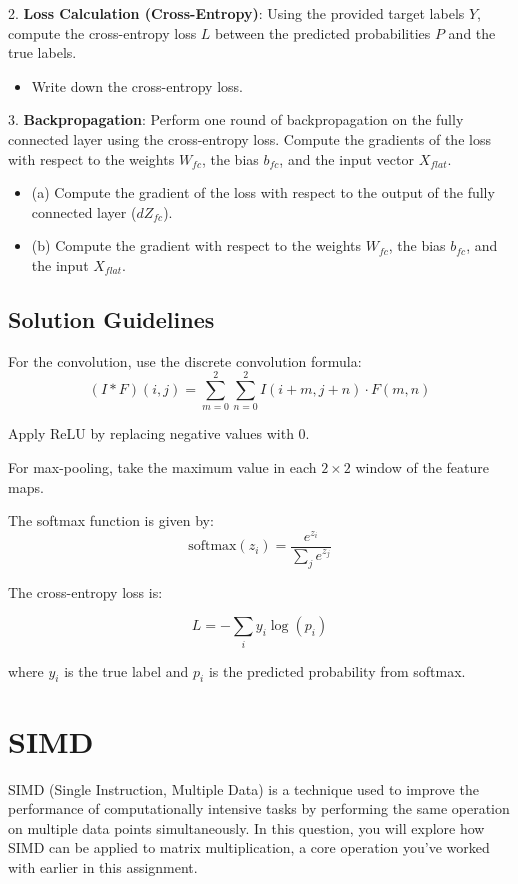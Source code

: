 \documentclass[a4 paper]{article}
\begin{document}
2. \textbf{Loss Calculation (Cross-Entropy)}: Using the provided target labels $Y$, compute the cross-entropy loss $L$ between the predicted probabilities $P$ and the true labels.
    \begin{itemize}
        \item Write down the cross-entropy loss.
    \end{itemize}

3. \textbf{Backpropagation}: Perform one round of backpropagation on the fully connected layer using the cross-entropy loss. Compute the gradients of the loss with respect to the weights $W_{fc}$, the bias $b_{fc}$, and the input vector $X_{flat}$.
    \begin{itemize}
        \item (a) Compute the gradient of the loss with respect to the output of the fully connected layer ($dZ_{fc}$).
        \item (b) Compute the gradient with respect to the weights $W_{fc}$, the bias $b_{fc}$, and the input $X_{flat}$.
    \end{itemize}

\subsection*{Solution Guidelines}
For the convolution, use the discrete convolution formula:
\[
(I * F)(i, j) = \sum_{m=0}^{2} \sum_{n=0}^{2} I(i+m, j+n) \cdot F(m, n)
\]

Apply ReLU by replacing negative values with 0.

For max-pooling, take the maximum value in each $2 \times 2$ window of the feature maps.\newline

The softmax function is given by:
\[
\text{softmax}(z_i) = \frac{e^{z_i}}{\sum_j e^{z_j}}
\]

The cross-entropy loss is:

\[
L = -\sum_{i} y_i \log(p_i)
\]

where $y_i$ is the true label and $p_i$ is the predicted probability from softmax.


\solution{}


\newpage
\section{SIMD}
\label{sec:simd}

SIMD (Single Instruction, Multiple Data) is a technique used to improve the performance of computationally intensive tasks by performing the same operation on multiple data points simultaneously. In this question, you will explore how SIMD can be applied to matrix multiplication, a core operation you've worked with earlier in this assignment.
\end{document}
